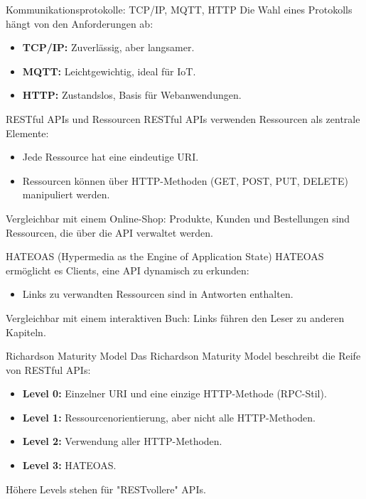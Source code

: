 \documentclass{beamer}
\begin{document}
\begin{frame}{Kommunikationsprotokolle: TCP/IP, MQTT, HTTP}
    Die Wahl eines Protokolls hängt von den Anforderungen ab:
    \begin{itemize}
        \item \textbf{TCP/IP:} Zuverlässig, aber langsamer.
        \item \textbf{MQTT:} Leichtgewichtig, ideal für IoT.
        \item \textbf{HTTP:} Zustandslos, Basis für Webanwendungen.
    \end{itemize}
\end{frame}

\begin{frame}{RESTful APIs und Ressourcen}
    RESTful APIs verwenden Ressourcen als zentrale Elemente:
    \begin{itemize}
        \item Jede Ressource hat eine eindeutige URI.
        \item Ressourcen können über HTTP-Methoden (GET, POST, PUT, DELETE) manipuliert werden.
    \end{itemize}
    Vergleichbar mit einem Online-Shop: Produkte, Kunden und Bestellungen sind Ressourcen, die über die API verwaltet werden.
\end{frame}

\begin{frame}{HATEOAS (Hypermedia as the Engine of Application State)}
    HATEOAS ermöglicht es Clients, eine API dynamisch zu erkunden:
    \begin{itemize}
        \item Links zu verwandten Ressourcen sind in Antworten enthalten.
    \end{itemize}
    Vergleichbar mit einem interaktiven Buch: Links führen den Leser zu anderen Kapiteln.
\end{frame}

\begin{frame}{Richardson Maturity Model}
    Das Richardson Maturity Model beschreibt die Reife von RESTful APIs:
    \begin{itemize}
        \item \textbf{Level 0:} Einzelner URI und eine einzige HTTP-Methode (RPC-Stil).
        \item \textbf{Level 1:} Ressourcenorientierung, aber nicht alle HTTP-Methoden.
        \item \textbf{Level 2:} Verwendung aller HTTP-Methoden.
        \item \textbf{Level 3:} HATEOAS.
    \end{itemize}
    Höhere Levels stehen für "RESTvollere" APIs.
\end{frame}
\end{document}
